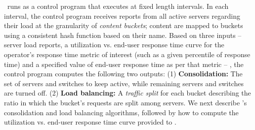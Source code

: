\shrink\ runs as a control program that executes at fixed length intervals. In each interval, the control program receives  reports from all active servers regarding their load at the granularity of \emph{content buckets}; content are mapped to buckets using a consistent hash function based on their name.  
Based on three inputs  -- server load reports, a utilization vs. end-user response time curve for the operator's response time metric of interest (such as a given percentile of response time) and a specified value of end-user response time as per that metric -- , the control program computes the following two outputs: (1) \textbf{Consolidation:} The set of servers and switches to keep active, while remaining servers and switches are turned off. (2) \textbf{Load balancing:} A \emph{traffic split} for each bucket describing the ratio in which the bucket's requests are split among servers. We next describe \shrink's consolidation and load balancing algorithms, followed by how to compute the utilization vs. end-user response time curve provided to \shrink.
%
%
%
%
%
%
%






